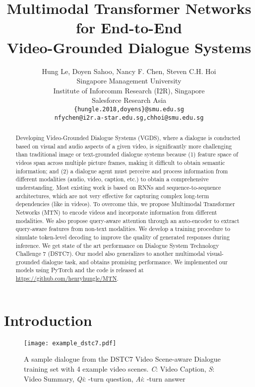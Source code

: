 \documentclass[11pt,a4paper]{article}
\title{Multimodal Transformer Networks for End-to-End \\Video-Grounded Dialogue Systems}
\author{Hung Le, Doyen Sahoo, Nancy F. Chen, Steven C.H. Hoi \\
  Singapore Management University \\
  Institute of Inforcomm Research (I2R), Singapore \\
  Salesforce Research Asia \\
  \texttt{\{hungle.2018,doyens\}@smu.edu.sg}\\
  \texttt{nfychen@i2r.a-star.edu.sg,chhoi@smu.edu.sg}
 }
\date{}
\begin{document}
\maketitle

\begin{abstract}
Developing Video-Grounded Dialogue Systems (VGDS), where a dialogue is conducted based on visual and audio aspects of a given video, is significantly more challenging than traditional image or text-grounded dialogue systems because 
(1) feature space of videos span across multiple picture frames, making it difficult to obtain semantic information; and (2) a dialogue agent must perceive and process information from different modalities (audio, video, caption, etc.) to obtain a comprehensive understanding.  Most existing work is based on RNNs and sequence-to-sequence architectures, which are not very effective for capturing complex long-term dependencies (like in videos).  To overcome this, we propose Multimodal Transformer Networks (MTN) to encode videos and incorporate information from different modalities. We also propose query-aware attention through an auto-encoder to extract query-aware features from non-text modalities. We develop a training procedure to simulate token-level decoding to improve the quality of generated responses during inference. We get state of the art performance on Dialogue System Technology Challenge 7 (DSTC7). Our model also generalizes to another multimodal visual-grounded dialogue task, and obtains promising performance.  We implemented our models using PyTorch and the code is released at \url{https://github.com/henryhungle/MTN}.

\end{abstract}

\section{Introduction}


\begin{figure}[h]
    \centering
	\texttt{[image: example\_dstc7.pdf]}
\caption{A sample dialogue from the DSTC7 Video Scene-aware Dialogue training set with 4 example video scenes. \textit{C}: Video Caption, \textit{S}: Video Summary, \textit{Qi}: -turn question, \textit{Ai}: -turn answer}
	\label{fig:data}
	\vspace{-0.5cm}
\end{figure}
\end{document}
